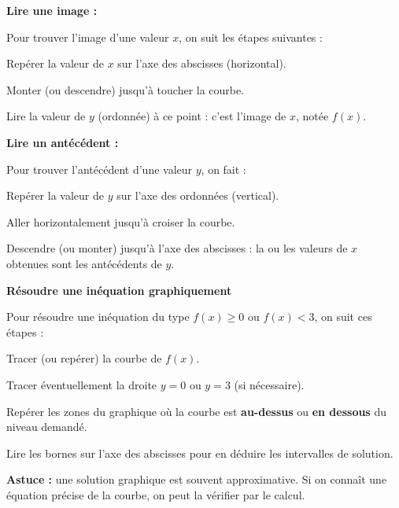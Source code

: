 \documentclass[a4paper,12pt]{article}
\begin{document}
\begin{tcolorbox}[colback=blue!5!white, colframe=blue!75!black, title=Lecture graphique, breakable]
  \textbf{Lire une image :}
  
  \vspace{1em}
  
  Pour trouver l'image d'une valeur $x$, on suit les étapes suivantes :
  \begin{compactitem}
      \item Repérer la valeur de $x$ sur l'axe des abscisses (horizontal).
      \item Monter (ou descendre) jusqu'à toucher la courbe.
      \item Lire la valeur de $y$ (ordonnée) à ce point : c'est l'image de $x$, notée $f(x)$.
  \end{compactitem}
  
  \vspace{1em}
  
  \textbf{Lire un antécédent :}
  
  \vspace{1em}

  Pour trouver l'antécédent d'une valeur $y$, on fait :
  \begin{compactitem}
      \item Repérer la valeur de $y$ sur l'axe des ordonnées (vertical).
      \item Aller horizontalement jusqu'à croiser la courbe.
      \item Descendre (ou monter) jusqu'à l'axe des abscisses : la ou les valeurs de $x$ obtenues sont les antécédents de $y$.
  \end{compactitem}
  
  \vspace{1em}

  \textbf{Résoudre une inéquation graphiquement}

  \vspace{1em}

  Pour résoudre une inéquation du type $f(x) \geq 0$ ou $f(x) < 3$, on suit ces étapes :
  \begin{compactitem}
      \item Tracer (ou repérer) la courbe de $f(x)$.
      \item Tracer éventuellement la droite $y = 0$ ou $y = 3$ (si nécessaire).
      \item Repérer les zones du graphique où la courbe est \textbf{au-dessus} ou \textbf{en dessous} du niveau demandé.
      \item Lire les bornes sur l'axe des abscisses pour en déduire les intervalles de solution.
  \end{compactitem}
  
  \textbf{Astuce :} une solution graphique est souvent approximative. Si on connaît une équation précise de la courbe, on peut la vérifier par le calcul.
\end{tcolorbox}
\end{document}
